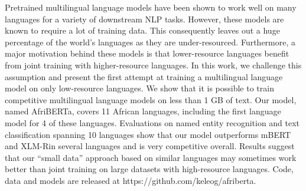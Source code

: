 Pretrained multilingual language models have been shown to work well on many languages for a variety of downstream NLP tasks. However, these models are known to require a lot of training data. This consequently leaves out a huge percentage of the world's languages as they are under-resourced. Furthermore, a major motivation behind these models is that lower-resource languages benefit from joint training with higher-resource languages. In this work, we challenge this assumption and present the first attempt at training a multilingual language model on only low-resource languages. We show that it is possible to train competitive multilingual language models on less than 1 GB of text. Our model, named AfriBERTa, covers 11 African languages, including the first language model for 4 of these languages. Evaluations on named entity recognition and text classification spanning 10 languages show that our model outperforms mBERT and XLM-Rin several languages and is very competitive overall. Results suggest that our ``small data'' approach based on similar languages may sometimes work better than joint training on large datasets with high-resource languages. Code, data and models are released at https://github.com/keleog/afriberta.
